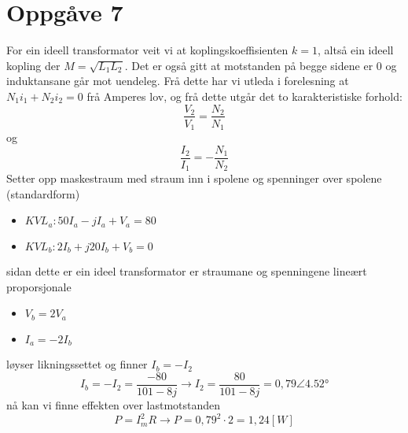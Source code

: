 \documentclass[12pt,a4paper]{article}
\begin{document}
  \section*{Oppgåve 7}
    For ein ideell transformator veit vi at koplingskoeffisienten $k=1$, altså ein
    ideell kopling der $M = \sqrt{L_1L_2}$. Det er også gitt at motstanden på begge sidene
    er $0$ og induktansane går mot uendeleg. Frå dette har vi utleda i forelesning at
    $N_1i_1 + N_2i_2 = 0$ frå Amperes lov, og frå dette utgår det to karakteristiske
    forhold:
    \begin{equation}
      \frac{V_2}{V_1} = \frac{N_2}{N_1}
    \end{equation}
    og
    \begin{equation}
      \frac{I_2}{I_1} = -\frac{N_1}{N_2}
    \end{equation}
    Setter opp maskestraum med straum inn i spolene og spenninger over spolene (standardform)
    \begin{itemize}
      \item $KVL_a: 50I_a - jI_a + V_a = 80$
      \item $KVL_b: 2I_b + j20I_b + V_b = 0$
    \end{itemize}
    sidan dette er ein ideel transformator er straumane og spenningene lineært proporsjonale
    \begin{itemize}
      \item $V_b = 2V_a$
      \item $I_a = -2I_b$
    \end{itemize}
    løyser likningssettet og finner $I_b = -I_2$
    \begin{equation}
      I_b = -I_2 = \frac{-80}{101-8j} \rightarrow I_2 = \frac{80}{101-8j} = 0,79 \angle \ang{4,52}
    \end{equation}
    nå kan vi finne effekten over lastmotstanden
    \begin{equation}
      P = I_m^2 R \rightarrow P = 0,79^2\cdot 2 = 1,24 [W]
    \end{equation}


  \newpage
\end{document}
